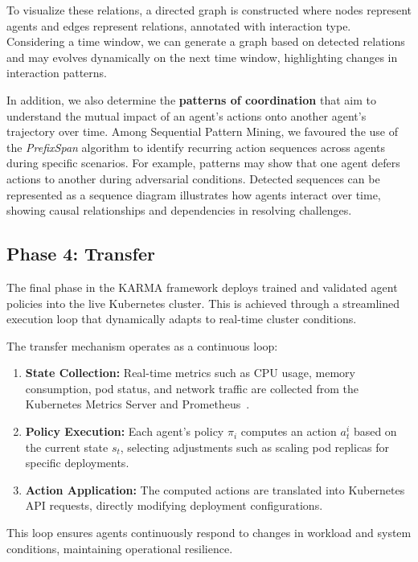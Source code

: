 \documentclass[conference]{IEEEtran}
\begin{document}
To visualize these relations, a directed graph is constructed where nodes represent agents and edges represent relations, annotated with interaction type. Considering a time window, we can generate a graph based on detected relations and may evolves dynamically on the next time window, highlighting changes in interaction patterns.

In addition, we also determine the \textbf{patterns of coordination} that aim to understand the mutual impact of an agent's actions onto another agent's trajectory  over time. Among Sequential Pattern Mining, we favoured the use of the \textit{PrefixSpan} algorithm to identify recurring action sequences across agents during specific scenarios. For example, patterns may show that one agent defers actions to another during adversarial conditions. Detected sequences can be represented as a sequence diagram illustrates how agents interact over time, showing causal relationships and dependencies in resolving challenges.



\subsection{Phase 4: Transfer}
\label{sec:transfer}


The final phase in the KARMA framework deploys trained and validated agent policies into the live Kubernetes cluster. This is achieved through a streamlined execution loop that dynamically adapts to real-time cluster conditions.

The transfer mechanism operates as a continuous loop:
\begin{enumerate}
    \item \textbf{State Collection:} Real-time metrics such as CPU usage, memory consumption, pod status, and network traffic are collected from the Kubernetes Metrics Server and Prometheus~\cite{prometheus}.
    \item \textbf{Policy Execution:} Each agent's policy $\pi_i$ computes an action $a_t^i$ based on the current state $s_t$, selecting adjustments such as scaling pod replicas for specific deployments.
    \item \textbf{Action Application:} The computed actions are translated into Kubernetes API requests, directly modifying deployment configurations.
\end{enumerate}
This loop ensures agents continuously respond to changes in workload and system conditions, maintaining operational resilience.
\end{document}
